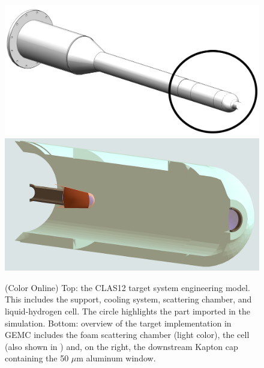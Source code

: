 \begin{figure}
	\centering
	\includegraphics[width=0.99\columnwidth,keepaspectratio]{img/targetOverview2.png}
	\includegraphics[width=0.99\columnwidth,keepaspectratio]{img/targetOverview1.png}
	\caption{(Color Online) Top: the CLAS12 target system engineering model. This includes the support, cooling system, scattering chamber, and
			 liquid-hydrogen cell. The circle highlights the part imported in the simulation.
			 Bottom: overview of the target implementation in GEMC includes the foam scattering chamber (light color), the
			 cell (also shown in ) and, on the right, the downstream Kapton cap containing the 50 $\mu$m aluminum window. }
	\label{fig:targetOverview}
\end{figure}






